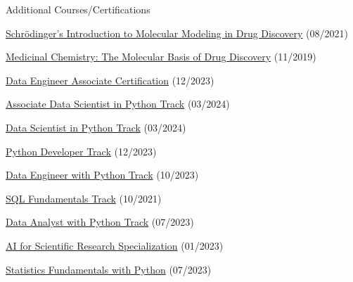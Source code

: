 \begin{cventries}
  \cventry
    {}
    {Additional Courses/Certifications}
    {}
    {}
    {
        \begin{cvitems}
            \item{\href{https://api.badgr.io/public/assertions/zZ7-bHnkTcm6H_UNr2s-LA}{Schrödinger's Introduction to Molecular Modeling in Drug Discovery} (08/2021)}           
            \item{\href{https://courses.edx.org/certificates/27307d91954041dab94af0ff554bc378}{Medicinal Chemistry: The Molecular Basis of Drug Discovery} (11/2019)}
            \item{\href{https://www.datacamp.com/certificate/DEA0011913814162}{Data Engineer Associate Certification} (12/2023)}
            \item{\href{https://www.datacamp.com/completed/statement-of-accomplishment/track/3f61a8ef80ab45ae62041398e11d0132f381250d}{Associate Data Scientist in Python Track} (03/2024)}
            \item{\href{https://www.datacamp.com/completed/statement-of-accomplishment/track/af77456b193609f6a644bffc88e1b7d761230908}{Data Scientist in Python Track} (03/2024)}
            \item{\href{https://www.datacamp.com/statement-of-accomplishment/track/d27013d491083bee7eb7302d45d142e6eff5c4c9}{Python Developer Track} (12/2023)}
            \item{\href{https://www.datacamp.com/completed/statement-of-accomplishment/track/fb10963085f36d129d1ac686f14acd5bb255d33d}{Data Engineer with Python Track} (10/2023)}
            \item{\href{https://www.datacamp.com/statement-of-accomplishment/track/941904e6394e2951693441d466f4643e5edfb4de}{SQL Fundamentals Track} (10/2021)}
            \item{\href{https://www.datacamp.com/completed/statement-of-accomplishment/track/4d9fb22f2514baecb5866aecd4421ba951e418a1}{Data Analyst with Python Track} (07/2023)}
            \item{\href{https://www.coursera.org/account/accomplishments/specialization/XU23J53N3SAW}{AI for Scientific Research Specialization} (01/2023)}
            \item{\href{https://www.datacamp.com/completed/statement-of-accomplishment/track/f6b840f135825806cde25b622730d804b8e9b987}{Statistics Fundamentals with Python} (07/2023)}

\end{cvitems}}
\end{cventries}
